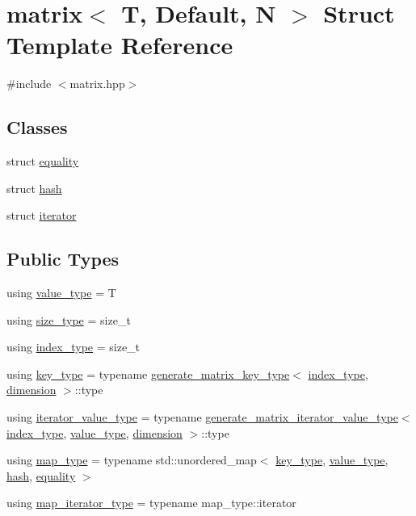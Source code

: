\hypertarget{structmatrix}{}\section{matrix$<$ T, Default, N $>$ Struct Template Reference}
\label{structmatrix}


{\ttfamily \#include $<$matrix.\+hpp$>$}

\subsection*{Classes}
\begin{DoxyCompactItemize}
\item 
struct \hyperlink{structmatrix_1_1equality}{equality}
\item 
struct \hyperlink{structmatrix_1_1hash}{hash}
\item 
struct \hyperlink{structmatrix_1_1iterator}{iterator}
\end{DoxyCompactItemize}
\subsection*{Public Types}
\begin{DoxyCompactItemize}
\item 
using \hyperlink{structmatrix_aeb660563444929ee10d8a0b06d42a951}{value\+\_\+type} = T
\item 
using \hyperlink{structmatrix_a1a99bcb39d34cb8acd10a5d1a260542b}{size\+\_\+type} = size\+\_\+t
\item 
using \hyperlink{structmatrix_aa800607a99454f7d958b4d6565ca9751}{index\+\_\+type} = size\+\_\+t
\item 
using \hyperlink{structmatrix_ae7906bda02f5d7f6744d9545c9465e13}{key\+\_\+type} = typename \hyperlink{classgenerate__matrix__key__type}{generate\+\_\+matrix\+\_\+key\+\_\+type}$<$ \hyperlink{structmatrix_aa800607a99454f7d958b4d6565ca9751}{index\+\_\+type}, \hyperlink{structmatrix_ad9335b977ea0dfdd152314be10591379}{dimension} $>$\+::type
\item 
using \hyperlink{structmatrix_a54b3613a5cf2df7a45556b017ebe306f}{iterator\+\_\+value\+\_\+type} = typename \hyperlink{classgenerate__matrix__iterator__value__type}{generate\+\_\+matrix\+\_\+iterator\+\_\+value\+\_\+type}$<$ \hyperlink{structmatrix_aa800607a99454f7d958b4d6565ca9751}{index\+\_\+type}, \hyperlink{structmatrix_aeb660563444929ee10d8a0b06d42a951}{value\+\_\+type}, \hyperlink{structmatrix_ad9335b977ea0dfdd152314be10591379}{dimension} $>$\+::type
\item 
using \hyperlink{structmatrix_af76ef63f3afb1e21eb859bc3ff0885fb}{map\+\_\+type} = typename std\+::unordered\+\_\+map$<$ \hyperlink{structmatrix_ae7906bda02f5d7f6744d9545c9465e13}{key\+\_\+type}, \hyperlink{structmatrix_aeb660563444929ee10d8a0b06d42a951}{value\+\_\+type}, \hyperlink{structmatrix_1_1hash}{hash}, \hyperlink{structmatrix_1_1equality}{equality} $>$
\item 
using \hyperlink{structmatrix_a73d7dc1f59c66d8fede2107be5ff190d}{map\+\_\+iterator\+\_\+type} = typename map\+\_\+type\+::iterator
\end{DoxyCompactItemize}
